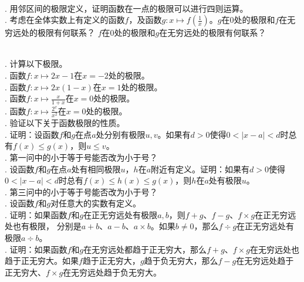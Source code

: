 \documentclass[12pt,UTF8]{ctexbook}
\begin{document}

\begin{sk}
    \mbox{} \\
    . 用邻区间的极限定义，证明函数在一点的极限可以进行四则运算。\\
    . 考虑在全体实数上有定义的函数$f$，及函数$g:x\mapsto f\left(\frac{1}{x}\right)$。$g$在$0$处的极限和$f$在无穷远处的极限有何联系？
    $f$在$0$处的极限和$g$在无穷远处的极限有何联系？
\end{sk}

\begin{xt}
    \mbox{} \\
    . 计算以下极限。\\
    . 函数$f:x\mapsto 2x - 1$在$x = -2$处的极限。\\
    . 函数$f:x\mapsto 2x(1 - x)$在$x = 1$处的极限。\\
    . 函数$f:x\mapsto \displaystyle\frac{x}{1 + x}$在$x = 0$处的极限。\\
    . 函数$f:x\mapsto \displaystyle\frac{2^x}{x^2}$在$x = 0$处的极限。\\
    . 验证以下关于函数极限的性质。\\
    . 证明：设函数$f$和$g$在点$a$处分别有极限$u,v$。如果有$d>0$使得$0<|x-a|<d$时总有$f(x)\leqslant g(x)$，则$u \leqslant v$。\\
    . 第一问中的小于等于号能否改为小于号？\\
    . 设函数$f$和$g$在点$a$处有相同极限$u$，$h$在$a$附近有定义。证明：如果有$d>0$使得$0<|x-a|<d$时总有$f(x)\leqslant h(x) \leqslant g(x)$，则$h$在$a$处有极限$u$。\\ . 第三问中的小于等于号能否改为小于号？\\
    . 设函数$f$和$g$对任意大的实数有定义。\\
    . 证明：如果函数$f$和$g$在正无穷远处有极限$a, b$，则$f + g$、$f - g$、$f \times g$在正无穷远处也有极限，
    分别是$a + b$、$a - b$、$a \times b$。如果$b\neq 0$，那么$f \div g$在正无穷远处有极限$a \div b$。\\
    . 证明：如果函数$f$和$g$在无穷远处都趋于正无穷大，那么$f + g$、$f \times g$在无穷远处也趋于正无穷大。如果$f$趋于正无穷大，$g$趋于负无穷大，那么$f - g$在无穷远处趋于正无穷大、$f \times g$在无穷远处趋于负无穷大。\\

\end{xt}
\end{document}
